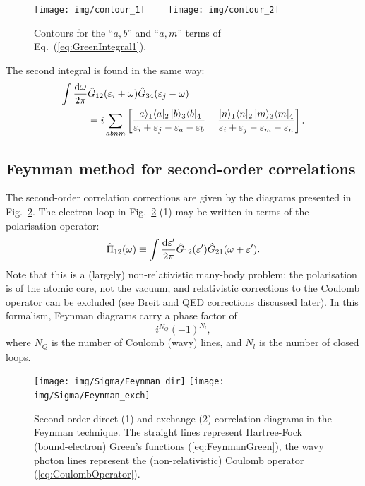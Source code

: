 \documentclass[10pt,twocolumn,a4paper]{article}%
\newcommand{\bra}[1]{\ensuremath{\langle #1|}}	%
\newcommand{\ket}[1]{\ensuremath{|#1\rangle}}
\newcommand{\be}{\begin{equation}}
\newcommand{\ee}{\end{equation}}
\def\d{\ensuremath{{\rm d}}}
\def\en{\ensuremath{\varepsilon}}
\newcommand{\w}{\ensuremath{\omega}}
\begin{document}
\begin{figure}%
\centering
\texttt{[image: img/contour\_1]}~~~~
\texttt{[image: img/contour\_2]}
\caption{\small Contours for the ``$a,b$'' and ``$a,m$'' terms of Eq.~(\ref{eq:GreenIntegral1}).\label{fig:contour}}
\end{figure}

The second integral is found in the same way:
\begin{align}
\int \frac{\d \w}{2\pi}&\hat G_{12}(\en_i+\w) \hat G_{34}(\en_j - \omega)\notag\\
&=
i\sum_{abnm}\left[
\frac{\ket{a}_1\bra{a}_2 \, \ket{b}_3\bra{b}_4}{\en_i+\en_j - \en_a - \en_b}
-
\frac{\ket{n}_1\bra{n}_2 \, \ket{m}_3\bra{m}_4}{\en_i + \en_j - \en_m - \en_n}
\right].
\label{eq:GreenInt2}
\end{align}



\subsection{Feynman method for second-order correlations}



The second-order correlation corrections are given by the diagrams presented in Fig.~\ref{fig:Sigma2-Feyn}.
The electron loop in Fig.~\ref{fig:Sigma2-Feyn} (1) may be written in terms of the polarisation operator:
\be\label{eq:PolarisationOperator}
\hat\Pi_{12}(\w) \equiv \int \frac{\d \en'}{2\pi}\hat  G_{12}(\en') \hat G_{21}(\w+\en') .
\ee
Note that this is a (largely) non-relativistic many-body problem; the polarisation is of the atomic core, not the vacuum, and relativistic corrections to the Coulomb operator can be excluded (see Breit and QED corrections discussed later).
In this formalism, Feynman diagrams carry a phase factor of~\cite{Abrikosov1965}
\be\label{eq:phaseFactor}
i^{N_{Q}}(-1)^{N_{l}},
\ee
where $N_{Q}$ is the number of Coulomb (wavy) lines, and $N_{l}$ is the number of closed loops.


\begin{figure}%
\centering
\texttt{[image: img/Sigma/Feynman\_dir]}
\texttt{[image: img/Sigma/Feynman\_exch]}
\caption{\label{fig:Sigma2-Feyn}\small Second-order direct (1) and exchange (2) correlation diagrams in the Feynman technique.
The straight lines represent Hartree-Fock (bound-electron) Green's functions (\ref{eq:FeynmanGreen}),
the wavy photon lines represent the (non-relativistic) Coulomb operator (\ref{eq:CoulombOperator}).
}
\end{figure}
\end{document}
